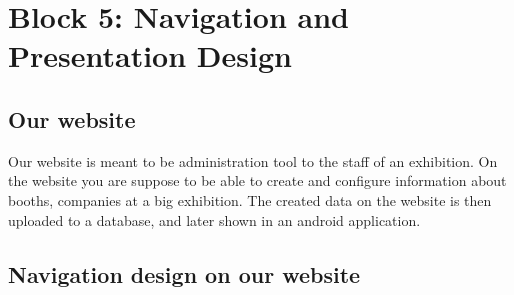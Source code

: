 \section{Block 5: Navigation and Presentation Design}
\subsection*{Our website}
Our website is meant to be administration tool to the staff of an exhibition. On the website you are suppose to be able to create and configure information about booths, companies at a big exhibition. The created data on the website is then uploaded to a database, and later shown in an android application.

\subsection*{Navigation design on our website}



